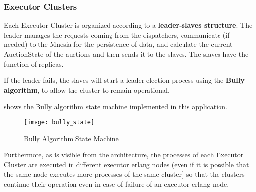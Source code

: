 \subsubsection{Executor Clusters}

Each Executor Cluster is organized according to a \textbf{leader-slaves
structure}. The leader manages the requests coming from the dispatchers,
communicate (if needed) to the Mnesia for the persistence of data, and calculate
the current AuctionState of the auctions and then sends it to the slaves. The
slaves have the function of replicas.

If the leader fails, the slaves will start a leader election process using the
\textbf{Bully algorithm}, to allow the cluster to remain operational.

 shows the Bully algorithm state machine implemented in
this application.

\begin{figure}[h]
	\centering
	\texttt{[image: bully\_state]}
	\caption{Bully Algorithm State Machine}\label{fig:bully_state}
\end{figure}


Furthermore, as is visible from the architecture, the processes of each Executor
Cluster are executed in different executor erlang nodes (even if it is possible
that the same node executes more processes of the same cluster) so that the
clusters continue their operation even in case of failure of an executor erlang
node.

